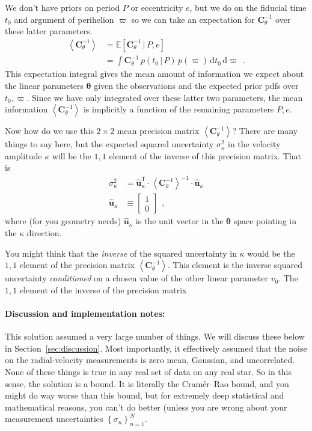 \documentclass[10pt, letterpaper]{article}
\newcommand{\sectionname}{Section}
\newcommand{\hquad}{~~}
\newcommand{\given}{\,|\,}
\newcommand{\dd}{\mathrm{d}}
\newcommand{\T}{^{\!\mathsf{T}\!}}
\newcommand{\inv}{^{-1}}
\newcommand{\setof}[1]{\left\{{#1}\right\}}
\newcommand{\mean}[1]{\left<{#1}\right>}
\newcommand{\expectation}[1]{\mathbb{E}\!\left[{#1}\right]}
\renewcommand{\vector}[1]{\boldsymbol{#1}}
\newcommand{\vu}{\vector{\hat{u}}}
\newcommand{\vtheta}{\vector{\theta}}
\newcommand{\tensor}[1]{\mathbf{#1}}
\newcommand{\tC}{\tensor{C}}
\newcounter{marginnote}
\renewcommand{\footnote}[1]{\refstepcounter{marginnote}\textsuperscript{\themarginnote}\marginpar{\color{darkgray}\raggedright\footnotesize\textsuperscript{\themarginnote}#1}}
\begin{document}
We don't have priors on period $P$ or eccentricity $e$, but we do on
the fiducial time $t_0$ and argument of perihelion $\varpi$ so we can
take an expectation for $\tC_\theta\inv$ over these latter parameters.
\begin{align}
  \mean{\tC_\theta\inv} &= \expectation{\tC_\theta\inv\given P, e}
  \\
                        &= \int \tC_\theta\inv\,p(t_0\given P)\,p(\varpi)\,\dd t_0\,\dd\varpi
\hquad .
\end{align}
This expectation integral gives the mean amount of information we
expect about the linear parameters $\vtheta$ given the observations
and the expected prior pdfs over $t_0, \varpi$.
Since we have only integrated over these latter two parameters, the
mean information $\mean{\tC_\theta\inv}$ is implicitly a function of
the remaining parameters $P, e$.

Now how do we use this $2\times 2$ mean precision matrix
$\mean{\tC_\theta\inv}$?  There are many things to say here, but the
expected squared uncertainty $\sigma^2_\kappa$ in the velocity
amplitude $\kappa$ will be the $1,1$ element of the inverse of this
precision matrix.
That is
\begin{align}
  \sigma^2_\kappa &= \vu_\kappa\T\cdot\mean{\tC_\theta\inv}\inv\cdot\vu_\kappa
  \\
  \vu_\kappa &\equiv \left[\begin{array}{c} 1 \\ 0 \end{array}\right]
  \hquad,
\end{align}
where (for you geometry nerds) $\vu_\kappa$ is the unit vector in the
$\vtheta$ space pointing in the $\kappa$ direction.

You might think that the \emph{inverse} of the squared uncertainty in $\kappa$ would be
the $1,1$ element of the precision matrix $\mean{\tC_\theta\inv}$.
This element is the inverse squared uncertainty \emph{conditioned} on
a chosen value of the other linear parameter $v_0$.
The $1,1$ element of the inverse of the precision matrix

\paragraph{Discussion and implementation notes:}
This solution assumed a very large number of things. We will discuss these
below in \sectionname~\ref{sec:discussion}. Most importantly, it effectively
assumed that the noise on the radial-velocity measurements is zero mean,
Gaussian, and uncorrelated. None of these things is true in any real
set of data on any real star. So in this sense, the solution is a bound.
It is literally the Cram\'er--Rao bound\footnote{HOGG CITE}, and you might
do way worse than this bound, but for extremely deep statistical and
mathematical reasons, you can't do better (unless you are wrong about your
measurement uncertainties $\setof{\sigma_n}_{n=1}^N$.
\end{document}
